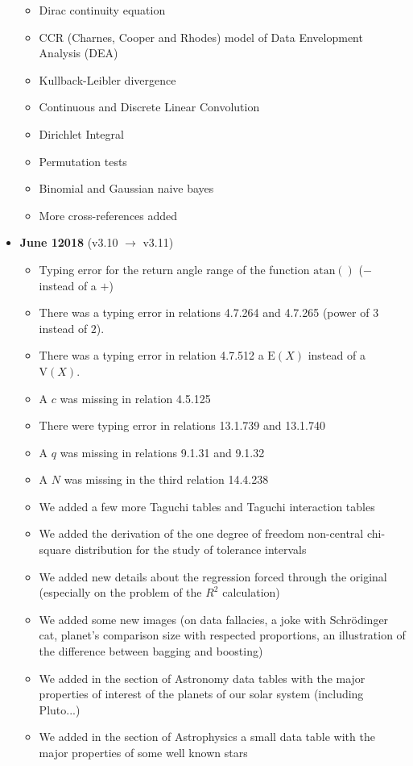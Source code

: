 \begin{itemize}
\begin{itemize}[noitemsep]
			\item Dirac continuity equation
			\item CCR (Charnes, Cooper and Rhodes) model of Data Envelopment Analysis (DEA)
			\item Kullback-Leibler divergence
			\item Continuous and Discrete Linear Convolution
			\item Dirichlet Integral
			\item Permutation tests
			\item Binomial and Gaussian naive bayes
			\item More cross-references added
		\end{itemize}
	\item \textbf{June 12018} (v3.10 $\rightarrow$ v3.11)
		\begin{itemize}[noitemsep]
			\item Typing error for the return angle range of the function $\mathrm{atan()}$ ($-$ instead of a $+$)
			\item There was a typing error in relations 4.7.264 and 4.7.265 (power of $3$ instead of $2$).
			\item There was a typing error in relation 4.7.512 a $\text{E}(X)$ instead of a $\text{V}(X)$.
			\item A $c$ was missing in relation 4.5.125
			\item There were typing error in relations 13.1.739 and 13.1.740
			\item A $q$ was missing in relations 9.1.31 and 9.1.32
			\item A $N$ was missing in the third relation 14.4.238
			\item We added a few more Taguchi tables and Taguchi interaction tables
			\item We added the derivation of the one degree of freedom non-central chi-square distribution for the study of tolerance intervals
			\item We added new details about the regression forced through the original (especially on the problem of the $R^2$ calculation)
			\item We added some new images (on data fallacies, a joke with Schrödinger cat, planet's comparison size with respected proportions, an illustration of the difference between bagging and boosting)
			\item We added in the section of Astronomy data tables with the major properties of interest of the planets of our solar system (including Pluto...)
			\item We added in the section of Astrophysics a small data table with the major properties of some well known stars

\end{itemize}
\end{itemize}

